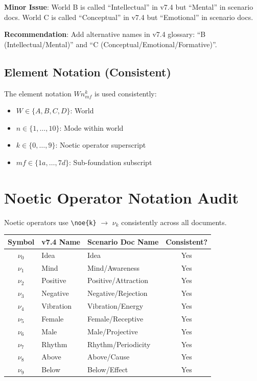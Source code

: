 \documentclass[11pt]{article}
\begin{document}
\textbf{Minor Issue}: World B is called ``Intellectual'' in v7.4 but ``Mental'' in scenario docs. World C is called ``Conceptual'' in v7.4 but ``Emotional'' in scenario docs.

\textbf{Recommendation}: Add alternative names in v7.4 glossary: ``B (Intellectual/Mental)'' and ``C (Conceptual/Emotional/Formative)''.

\subsection{Element Notation (Consistent)}
The element notation $Wn^k_{mf}$ is used consistently:
\begin{itemize}
    \item $W \in \{A, B, C, D\}$: World
    \item $n \in \{1, \ldots, 10\}$: Mode within world
    \item $k \in \{0, \ldots, 9\}$: Noetic operator superscript
    \item $mf \in \{1a, \ldots, 7d\}$: Sub-foundation subscript
\end{itemize}

\section{Noetic Operator Notation Audit}

\begin{tcolorbox}[colback=green!5!white,colframe=green!65!black,title=\textbf{Consistent Usage Confirmed}]
Noetic operators use \verb|\noe{k}| $\to$ $\nu_k$ consistently across all documents.
\end{tcolorbox}

\begin{center}
\begin{tabular}{c|l|l|c}
\toprule
\textbf{Symbol} & \textbf{v7.4 Name} & \textbf{Scenario Doc Name} & \textbf{Consistent?} \\
\midrule
$\nu_0$ & Idea & Idea & Yes \\
$\nu_1$ & Mind & Mind/Awareness & Yes \\
$\nu_2$ & Positive & Positive/Attraction & Yes \\
$\nu_3$ & Negative & Negative/Rejection & Yes \\
$\nu_4$ & Vibration & Vibration/Energy & Yes \\
$\nu_5$ & Female & Female/Receptive & Yes \\
$\nu_6$ & Male & Male/Projective & Yes \\
$\nu_7$ & Rhythm & Rhythm/Periodicity & Yes \\
$\nu_8$ & Above & Above/Cause & Yes \\
$\nu_9$ & Below & Below/Effect & Yes \\
\bottomrule
\end{tabular}
\end{center}
\end{document}
